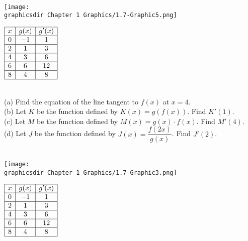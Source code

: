  \\
\begin{minipage}[t]{0.75\textwidth} \vspace{0pt}%
    \texttt{[image: \\graphicsdir Chapter 1 Graphics/1.7-Graphic5.png]}
\end{minipage} \hfill \begin{minipage}[t]{0.2\textwidth} \vspace{11pt}%
    \def\arraystretch{1.4}
    $\begin{array}{|c|c|c|}
        \hline
        x & g(x) & g'(x) \\ \hline
        0 & -1 & 1 \\ \hline
        2 & 1 & 3 \\ \hline
        4 & 3 & 6 \\ \hline
        6 & 6 & 12 \\ \hline
        8 & 4 & 8 \\
        \hline
    \end{array}$
\end{minipage} \\

(a) Find the equation of the line tangent to $f(x)$ at $x = 4$. \\[11pt]
(b) Let $K$ be the function defined by $K(x) = g(f(x))$. Find $K'(1)$. \\[11pt]
(c) Let $M$ be the function defined by $M(x) = g(x) \cdot f(x)$. Find $M'(4)$. \\[11pt]
(d) Let $J$ be the function defined by $J(x) = \dfrac{f(2x)}{g(x)}$. Find $J'(2)$. \\[11pt]

 \\
\begin{minipage}[t]{0.75\textwidth} \vspace{0pt}%
    \texttt{[image: \\graphicsdir Chapter 1 Graphics/1.7-Graphic3.png]}
\end{minipage} \hfill \begin{minipage}[t]{0.2\textwidth} \vspace{0pt}%
    \def\arraystretch{1.4}
    $\begin{array}{|c|c|c|}
        \hline
        x & g(x) & g'(x) \\ \hline
        0 & -1 & 1 \\ \hline
        2 & 1 & 3 \\ \hline
        4 & 3 & 6 \\ \hline
        6 & 6 & 12 \\ \hline
        8 & 4 & 8 \\
        \hline
    \end{array}$
\end{minipage} \\

